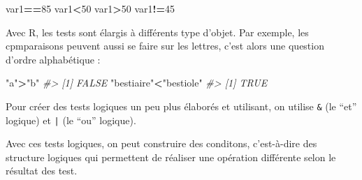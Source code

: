 \documentclass[]{article}
\newenvironment{Shaded}{\begin{snugshade}}{\end{snugshade}}
\newcommand{\CommentTok}[1]{\textcolor[rgb]{0.56,0.35,0.01}{\textit{#1}}}
\newcommand{\ControlFlowTok}[1]{\textcolor[rgb]{0.13,0.29,0.53}{\textbf{#1}}}
\newcommand{\DecValTok}[1]{\textcolor[rgb]{0.00,0.00,0.81}{#1}}
\newcommand{\KeywordTok}[1]{\textcolor[rgb]{0.13,0.29,0.53}{\textbf{#1}}}
\newcommand{\NormalTok}[1]{#1}
\newcommand{\OperatorTok}[1]{\textcolor[rgb]{0.81,0.36,0.00}{\textbf{#1}}}
\newcommand{\StringTok}[1]{\textcolor[rgb]{0.31,0.60,0.02}{#1}}
\begin{document}
\begin{Shaded}
\begin{Highlighting}[]
\NormalTok{var1}\OperatorTok{==}\DecValTok{85}
\NormalTok{var1}\OperatorTok{<}\DecValTok{50}
\NormalTok{var1}\OperatorTok{>}\DecValTok{50}
\NormalTok{var1}\OperatorTok{!=}\DecValTok{45}
\end{Highlighting}
\end{Shaded}

Avec R, les tests sont élargis à différents type d'objet. Par exemple, les cpmparaisons peuvent aussi se faire sur les lettres, c'est alors une question d'ordre alphabétique :

\begin{Shaded}
\begin{Highlighting}[]
\StringTok{"a"}\OperatorTok{>}\StringTok{"b"}
\CommentTok{#> [1] FALSE}
\StringTok{"bestiaire"}\OperatorTok{<}\StringTok{"bestiole"}
\CommentTok{#> [1] TRUE}
\end{Highlighting}
\end{Shaded}

Pour créer des tests logiques un peu plus élaborés et utilisant, on utilise \texttt{\&} (le ``et'' logique) et \texttt{|} (le ``ou'' logique).

\begin{Shaded}
\end{Shaded}

Avec ces tests logiques, on peut construire des conditons, c'est-à-dire des structure logiques qui permettent de réaliser une opération différente selon le résultat des test.

\begin{Shaded}
\end{Shaded}
\end{document}
